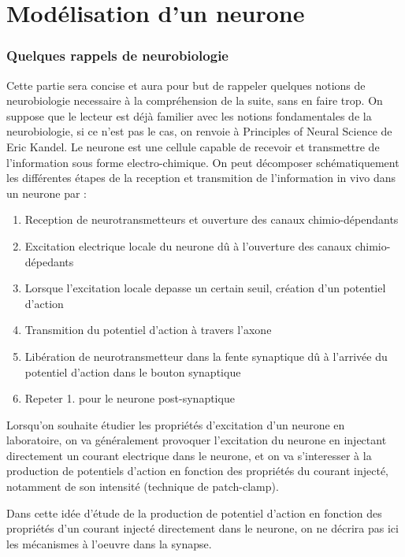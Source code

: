 \documentclass[12pt]{scrartcl}
\begin{document}
\pagebreak

\part{Modélisation d'un neurone}
\section{Quelques rappels de neurobiologie}
	Cette partie sera concise et aura pour but de rappeler quelques notions de neurobiologie necessaire à la compréhension de la suite, sans en faire trop. On suppose que le lecteur est déjà familier avec les notions fondamentales de la neurobiologie, si ce n'est pas le cas, on renvoie à Principles of Neural Science de Eric Kandel.  
Le neurone est une cellule capable de recevoir et transmettre de l'information sous forme electro-chimique. On peut décomposer schématiquement les différentes étapes de la reception et transmition de l'information in vivo dans un neurone par :
\begin{enumerate}
	\item Reception de neurotransmetteurs et ouverture des canaux chimio-dépendants
	\item Excitation electrique locale du neurone dû à l'ouverture des canaux chimio-dépedants
	\item Lorsque l'excitation locale depasse un certain seuil, création d'un potentiel d'action
	\item Transmition du potentiel d'action à travers l'axone
	\item Libération de neurotransmetteur dans la fente synaptique dû à l'arrivée du potentiel d'action dans le bouton synaptique 
	\item Repeter 1. pour le neurone post-synaptique
\end{enumerate}

	Lorsqu'on souhaite étudier les propriétés d'excitation d'un neurone en laboratoire, on va généralement provoquer l'excitation du neurone en injectant directement un courant electrique dans le neurone, et on va s'interesser à la production de potentiels d'action en fonction des propriétés du courant injecté, notamment de son intensité (technique de patch-clamp). 

	Dans cette idée d'étude de la production de potentiel d'action en fonction des propriétés d'un courant injecté directement dans le neurone, on ne décrira pas ici les mécanismes à l'oeuvre dans la synapse.
\end{document}
